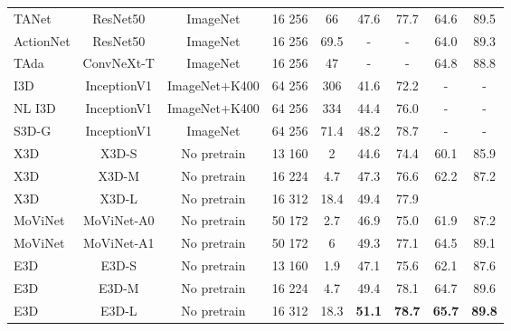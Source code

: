 \documentclass{article} \usepackage{iclr2023_conference,times}
\begin{document}
\begin{table}[]
{\begin{tabular}{l  c  c  c  c  c  c  c  c}
        TANet \citep{liu2021tam} & ResNet50 & ImageNet & 16  256 & 66 & 47.6 & 77.7 & 64.6 & 89.5\\
ActionNet \citep{wang2021actionnet} & ResNet50 & ImageNet & 16  256 & 69.5  & - & -  & 64.0 & 89.3\\
        TAda \citep{huang2021tada} & ConvNeXt-T & ImageNet & 16  256 & 47 & - & - & 64.8 & 88.8 \\
\midrule
        I3D \citep{carreira2017i3d}  & InceptionV1 & ImageNet+K400 & 64  256 & 306  & 41.6 & 72.2  & - & -\\
        NL I3D \citep{carreira2017i3d}  & InceptionV1 & ImageNet+K400 & 64  256 & 334  & 44.4 & 76.0 & - & -\\
S3D-G \citep{xie2018s3d} & InceptionV1 & ImageNet & 64  256 & 71.4  & 48.2 & 78.7  & - & -\\
        X3D \citep{feichtenhofer2020x3d} & X3D-S & No pretrain & 13  160 & 2  & 44.6 & 74.4   & 60.1 & 85.9\\
        X3D \citep{feichtenhofer2020x3d} & X3D-M & No pretrain & 16  224 & 4.7  & 47.3 & 76.6   & 62.2 & 87.2\\
        X3D \citep{feichtenhofer2020x3d} & X3D-L & No pretrain & 16  312 & 18.4  & 49.4 & 77.9   &  & \\
        MoViNet \citep{kondratyuk2021movinets} & MoViNet-A0 & No pretrain & 50  172 & 2.7  & 46.9 & 75.0  & 61.9 & 87.2\\
        MoViNet \citep{kondratyuk2021movinets} & MoViNet-A1 & No pretrain & 50  172 & 6  & 49.3 & 77.1  & 64.5 & 89.1\\
\midrule
        E3D & E3D-S & No pretrain & 13  160  & 1.9 & 47.1 & 75.6   & 62.1 & 87.6 \\
        E3D & E3D-M & No pretrain & 16  224  & 4.7 & 49.4 & 78.1  & 64.7 & 89.6 \\
        E3D & E3D-L & No pretrain & 16  312  & 18.3 & \textbf{51.1} & \textbf{78.7}  & \textbf{65.7} & \textbf{89.8} \\
        \bottomrule
        \end{tabular}
        }
        \label{tb:ss}
\end{table}
\end{document}

